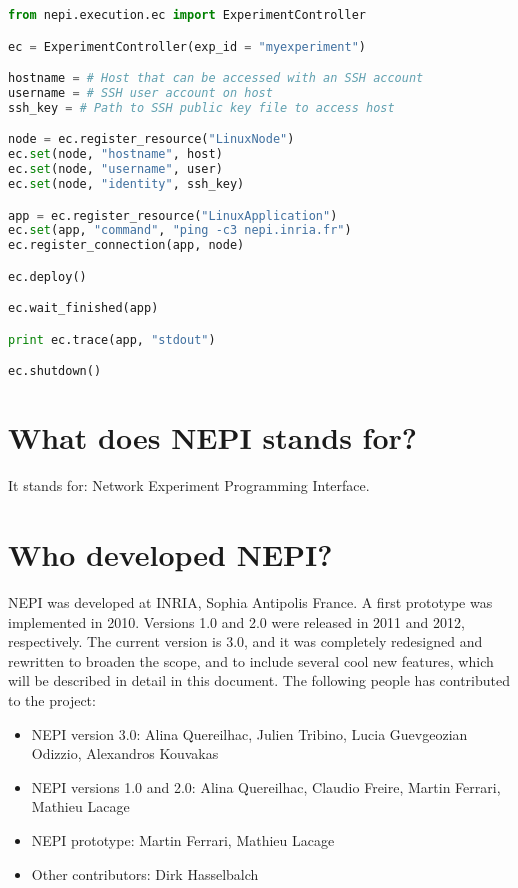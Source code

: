 \begin{lstlisting}[language=Python]
from nepi.execution.ec import ExperimentController

ec = ExperimentController(exp_id = "myexperiment")

hostname = # Host that can be accessed with an SSH account
username = # SSH user account on host
ssh_key = # Path to SSH public key file to access host

node = ec.register_resource("LinuxNode")
ec.set(node, "hostname", host)
ec.set(node, "username", user)
ec.set(node, "identity", ssh_key)

app = ec.register_resource("LinuxApplication")
ec.set(app, "command", "ping -c3 nepi.inria.fr")
ec.register_connection(app, node)

ec.deploy()

ec.wait_finished(app)

print ec.trace(app, "stdout")

ec.shutdown()

\end{lstlisting}

\section{What does NEPI stands for?}

It stands for: Network Experiment Programming Interface.

\section{Who developed NEPI?}

NEPI was developed at INRIA, Sophia Antipolis France.
A first prototype was implemented in 2010. 
Versions 1.0 and 2.0 were released in 2011 and 2012, respectively. 
The current version is 3.0, and it was completely redesigned and
rewritten to broaden the scope, and to include several cool 
new features, which will be described in detail in this document.
The following people has contributed to the project:

\begin{itemize}
  \item NEPI version 3.0: Alina Quereilhac, Julien Tribino, Lucia Guevgeozian Odizzio, Alexandros Kouvakas
  \item NEPI versions 1.0 and 2.0: Alina Quereilhac, Claudio Freire, Martin Ferrari, Mathieu Lacage
  \item NEPI prototype: Martin Ferrari, Mathieu Lacage
  \item Other contributors: Dirk Hasselbalch
\end{itemize}

